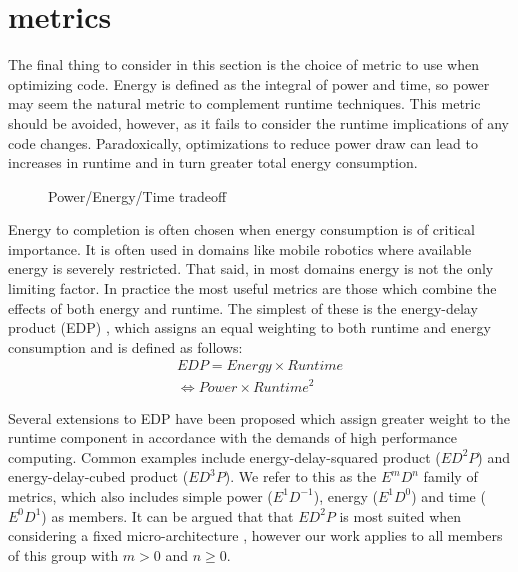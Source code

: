 \section{metrics}



The final thing to consider in this section is the choice of metric to use when optimizing code. Energy is defined as the integral of power and time, so power may seem the natural metric to complement runtime techniques. This metric should be avoided, however, as it fails to consider the runtime implications of any code changes. Paradoxically, optimizations to reduce power draw can lead to increases in runtime and in turn greater total energy consumption.

\begin{figure}
\centering

\caption{Power/Energy/Time tradeoff}
\label{fig:motivation}
\end{figure}

Energy to completion is often chosen when energy consumption is of critical importance. It is often used in domains like mobile robotics where available energy is severely restricted. That said, in most domains energy is not the only limiting factor. In practice the most useful metrics are those which combine the effects of both energy and runtime. The simplest of these is the energy-delay product (EDP) \cite{gonzales:1995aa}, which assigns an equal weighting to both runtime and energy consumption and is defined as follows:
\begin{align}
  EDP = Energy \times Runtime \nonumber \\
      \Leftrightarrow Power \times Runtime^{2} 
  \label{eq:edp}
\end{align}

Several extensions to EDP have been proposed which assign greater weight to the runtime component in accordance with the demands of high performance computing. Common examples include energy-delay-squared product ($ED^{2}P$) and energy-delay-cubed product ($ED^{3}P$). We refer to this as the $E^mD^n$ family of metrics, which also includes simple power ($E^1D^{-1}$), energy ($E^1D^0$) and time ($E^0D^1$) as members. It can be argued that that $ED^{2}P$ is most suited when considering a fixed micro-architecture \cite{brooks:2000aa}, however our work applies to all members of this group with $m > 0$ and $n \geq 0$.
